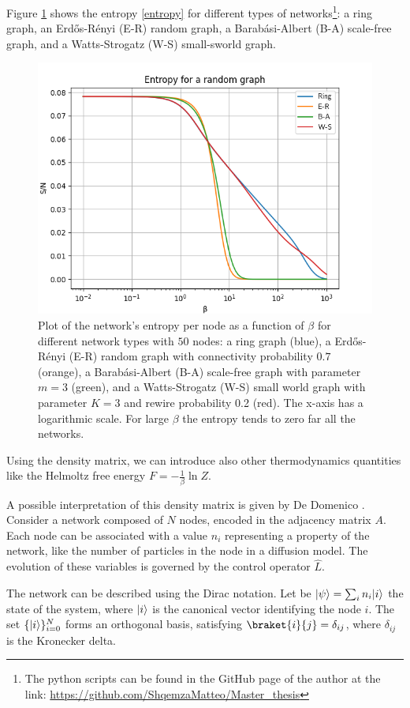 Figure \ref{fig:ER-BA-WS} shows the entropy \eqref{entropy} for different types of networks\footnote{The python scripts can be found in the GitHub page of the author at the link: \url{https://github.com/ShqemzaMatteo/Master_thesis}}: a ring graph, an Erd\H{o}s-Rényi (E-R) random graph, a Barab\'asi-Albert (B-A) scale-free graph, and a Watts-Strogatz (W-S) small-sworld graph.

\begin{figure}[ht!]
    \centering
    \includegraphics[width=0.75\linewidth]{image/random_graph.png}
    \caption{Plot of the network's entropy per node as a function of $\beta$ for different network types with $50$ nodes: a ring graph (blue), a Erd\H{o}s-Rényi (E-R) random graph with connectivity probability $0.7$ (orange), a Barab\'asi-Albert (B-A) scale-free graph with parameter $m=3$ (green), and a Watts-Strogatz (W-S) small world graph with parameter $K=3$ and rewire probability 0.2 (red). The x-axis has a logarithmic scale. For large $\beta$ the entropy tends to zero far all the networks.}
    \label{fig:ER-BA-WS}
\end{figure}

Using the density matrix, we can introduce also other thermodynamics quantities like the Helmoltz free energy $F = -\frac{1}{\beta} \ln Z$.


A possible interpretation of this density matrix is given by De Domenico \cite{De_Domenico_2020}.
Consider a network composed of $N$ nodes, encoded in the adjacency matrix $A$. Each node can be associated with a  value $n_i$ representing a property of the network, like the number of particles in the node in a diffusion model. 
The evolution of these variables is governed by the control operator $\hat L$. 

The network can be described using the Dirac notation. Let be $\lvert\psi\rangle = \sum_i n_i \lvert i\rangle$ the state of the system, where $\lvert i\rangle$ is the canonical vector identifying the node $i$. The set $\{\lvert i\rangle\}_{i=0}^N$ forms an orthogonal basis, satisfying $\braket{i}{j} = \delta_{ij}$, where $\delta_{ij}$ is the Kronecker delta.

